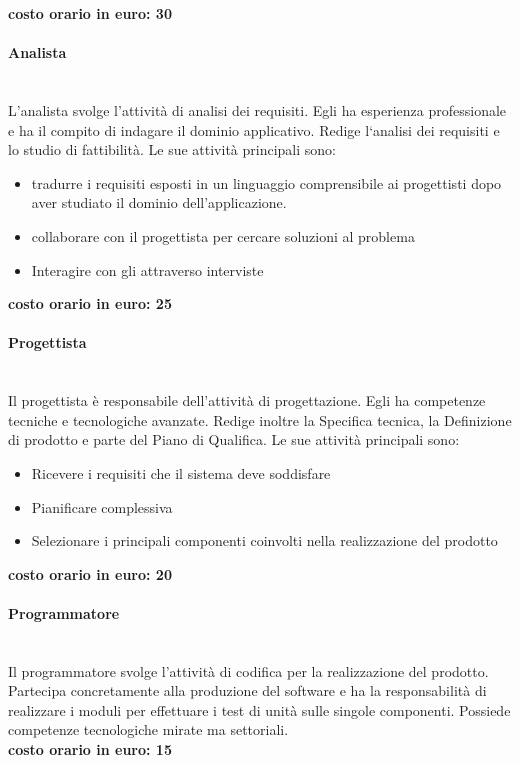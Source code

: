 \documentclass[../norme-di-progetto.tex]{subfiles}
\begin{document}
\textbf{costo orario in euro: 30}

\paragraph{Analista}%
\label{par:analista}
\\L'analista svolge l'attività di analisi dei requisiti.
Egli ha esperienza professionale e ha il compito di indagare il dominio applicativo.
Redige l`analisi dei requisiti e lo studio di fattibilità. Le sue attività principali sono:

\begin{itemize}
  \item tradurre i requisiti esposti in un linguaggio comprensibile ai progettisti dopo aver studiato il dominio dell'applicazione.
  \item collaborare con il progettista per cercare soluzioni al problema
  \item Interagire con gli  attraverso interviste
\end{itemize}

\textbf{costo orario in euro: 25}

\paragraph{Progettista}%
\label{par:progettista}
\\Il progettista è responsabile dell'attività di progettazione.
Egli ha competenze tecniche e tecnologiche avanzate.
Redige inoltre la Specifica tecnica, la Definizione di prodotto e parte del Piano di Qualifica.
Le sue attività principali sono:

\begin{itemize}
  \item Ricevere i requisiti che il sistema deve soddisfare
  \item Pianificare  complessiva
  \item Selezionare i principali componenti coinvolti nella realizzazione del prodotto
\end{itemize}

\textbf{costo orario in euro: 20}

\paragraph{Programmatore}%
\label{par:programmatore}
\\Il programmatore svolge l'attività di codifica per la realizzazione del prodotto.
Partecipa concretamente alla produzione del software e ha la responsabilità di realizzare i moduli per effettuare i test di unità sulle singole componenti.
Possiede competenze tecnologiche mirate ma settoriali.
\\\newline\textbf{costo orario in euro: 15}
\end{document}
